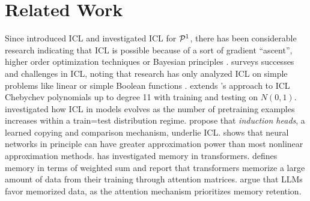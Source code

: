 \section{Related Work}
Since \cite{brown:etal:2020} introduced ICL and \cite{garg:etal:2022} investigated ICL for ${\cal P}^1$, there has been considerable research indicating that ICL is possible because of a sort of gradient ``ascent'', higher order optimization techniques or Bayesian principles \cite{akyurek:etal:2022,vonoswald:etal:2023,fu2023transformers,xie2021explanation, wu2023many, zhang2023and, panwar2023context}. %
\cite{dong2022survey} surveys successes and challenges in ICL, noting that research has only analyzed ICL on simple problems like linear or simple Boolean functions \citep{bhattamishra2023understanding}. \cite{wilcoxson:etal:2024} extends \cite{garg:etal:2022}'s approach to ICL Chebychev polynomials up to degree 11 with training and testing on $N(0,1)$.   %
\cite{raventos2024pretraining} investigated how ICL in models evolves as the number of pretraining examples increases within a train=test distribution regime. \cite{olsson:etal:2022} propose that {\em induction heads}, a learned copying and comparison mechanism, underlie ICL.  \cite{daubechies:etal:2022} shows that neural networks in principle can have greater approximation power than most nonlinear approximation methods.
\cite{geva:etal:2021} has investigated memory in transformers.  \cite{bietti:etal:2024} defines memory in terms of weighted sum and report that transformers memorize a large amount of data from their training through attention matrices. \cite{yu:etal:2023,geva:etal:2023} argue that LLMs favor memorized data, as the attention mechanism prioritizes memory retention.%



